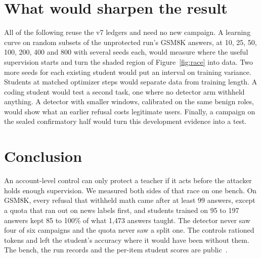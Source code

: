 \documentclass[journal]{IEEEtran}
\begin{document}
\section{What would sharpen the result}
\label{sec:next}
All of the following reuse the v7 ledgers and need no new campaign. A learning curve on random subsets of the unprotected run's GSM8K answers, at 10, 25, 50, 100, 200, 400 and 800 with several seeds each, would measure where the useful supervision starts and turn the shaded region of Figure~\ref{fig:race} into data. Two more seeds for each existing student would put an interval on training variance. Students at matched optimizer steps would separate data from training length. A coding student would test a second task, one where no detector arm withheld anything. A detector with smaller windows, calibrated on the same benign roles, would show what an earlier refusal costs legitimate users. Finally, a campaign on the sealed confirmatory half would turn this development evidence into a test.

\section{Conclusion}
An account-level control can only protect a teacher if it acts before the attacker holds enough supervision. We measured both sides of that race on one bench. On GSM8K, every refusal that withheld math came after at least 99 answers, except a quota that ran out on news labels first, and students trained on 95 to 197 answers kept 85 to 100\% of what 1,473 answers taught. The detector never saw four of six campaigns and the quota never saw a split one. The controls rationed tokens and left the student's accuracy where it would have been without them. The bench, the run records and the per-item student scores are public~\cite{trace2026artifact}.



\end{document}

